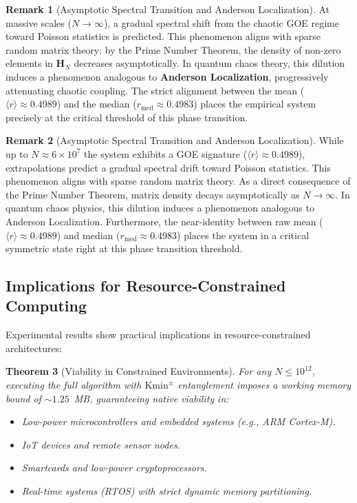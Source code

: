 \documentclass{article}
\numberwithin{equation}{section}
\theoremstyle{plain}
\newtheorem{theorem}{Theorem}[section]
\theoremstyle{definition}
\newtheorem{remark}[theorem]{Remark}
\begin{document}
\begin{remark}[Asymptotic Spectral Transition and Anderson Localization]
\label{rem:transicion-espectral}
At massive scales ($N \to \infty$), a gradual spectral shift from the chaotic GOE regime toward Poisson statistics is predicted. This phenomenon aligns with sparse random matrix theory: by the Prime Number Theorem, the density of non-zero elements in $\mathbf{H}_N$ decreases asymptotically. In quantum chaos theory, this dilution induces a phenomenon analogous to \textbf{Anderson Localization}, progressively attenuating chaotic coupling. The strict alignment between the mean ($\langle r \rangle \approx 0.4989$) and the median ($r_{\text{med}} \approx 0.4983$) places the empirical system precisely at the critical threshold of this phase transition.
\end{remark}

\begin{remark}[Asymptotic Spectral Transition and Anderson Localization]
\label{rem:transicion-espectral}
While up to $N \approx 6 \times 10^7$ the system exhibits a GOE signature ($\langle r \rangle \approx 0.4989$), extrapolations predict a gradual spectral drift toward Poisson statistics. This phenomenon aligns with sparse random matrix theory. As a direct consequence of the Prime Number Theorem, matrix density decays asymptotically as $N \to \infty$. In quantum chaos physics, this dilution induces a phenomenon analogous to Anderson Localization. Furthermore, the near-identity between raw mean ($\langle r \rangle \approx 0.4989$) and median ($r_{\text{med}} \approx 0.4983$) places the system in a critical symmetric state right at this phase transition threshold.
\end{remark}

\subsection{Implications for Resource-Constrained Computing}

Experimental results show practical implications in resource-constrained architectures:

\begin{theorem}[Viability in Constrained Environments]
\label{thm:viabilidad-rsr}
For any $N \le 10^{12}$, executing the full algorithm with $\mathrm{Kmin}^\pm$ entanglement imposes a working memory bound of $\sim 1.25$~MB, guaranteeing native viability in:
\begin{itemize}
    \item Low-power microcontrollers and embedded systems (e.g., ARM Cortex-M).
    \item IoT devices and remote sensor nodes.
    \item Smartcards and low-power cryptoprocessors.
    \item Real-time systems (RTOS) with strict dynamic memory partitioning.
\end{itemize}
\end{theorem}
\end{document}
